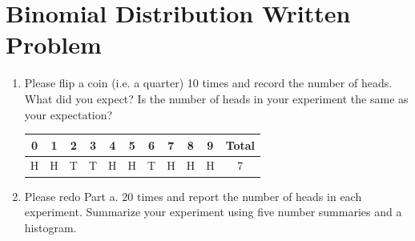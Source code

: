 \documentclass{article}
\begin{document}
\section*{Binomial Distribution Written Problem}
\begin{enumerate}[\quad(a)]
	\item Please flip a coin (i.e. a quarter) 10 times and record the number of heads. What did you expect? Is the number of heads in your experiment the same as your expectation?
	
	\begin{tabular}{|c|c|c|c|c|c|c|c|c|c|c|}
		\hline
		0 & 1 & 2 & 3 & 4 & 5 & 6 & 7 & 8 & 9 & Total \\
		\hline
		H & H & T & T & H & H & T & H & H & H & 7 \\
		\hline
	\end{tabular}
	\item Please redo Part a. 20 times and report the number of heads in each experiment. Summarize your experiment using five number summaries and a histogram.
	

\end{enumerate}
\end{document}
